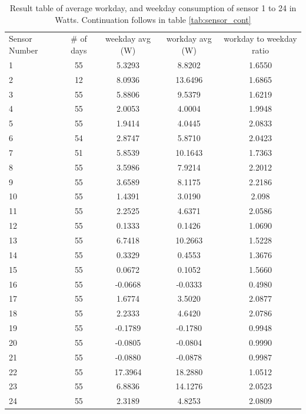 \begin{table}[h]
	\centering
	\begin{tabular}{l|c|c|c|c}
		Sensor Number & \# of days & weekday avg (W) & workday avg (W)& workday to weekday ratio \\
		1 & 55 & 5.3293 & 8.8202 & 1.6550 \\
		2 & 12 & 8.0936 & 13.6496 & 1.6865 \\ 
		3 & 55 & 5.8806 & 9.5379 & 1.6219  \\ 
		4 & 55 & 2.0053 & 4.0004 & 1.9948 \\
		5 & 55 & 1.9414 & 4.0445 & 2.0833 \\
		6 & 54 & 2.8747 & 5.8710 & 2.0423 \\ 
		7 & 51 & 5.8539 & 10.1643 & 1.7363  \\ 
		8 & 55 & 3.5986 & 7.9214 & 2.2012 \\
		9 & 55 & 3.6589 & 8.1175 & 2.2186 \\
		10 & 55 & 1.4391 & 3.0190 & 2.098 \\
		11 & 55 & 2.2525 & 4.6371 & 2.0586 \\ 
		12 & 55 & 0.1333 & 0.1426 & 1.0690 \\
		13 & 55 & 6.7418 & 10.2663 & 1.5228 \\
		14 & 55 & 0.3329 & 0.4553 & 1.3676 \\
		15 & 55 & 0.0672 & 0.1052 & 1.5660 \\
		16 & 55 & -0.0668 & -0.0333 & 0.4980 \\
		17 & 55 & 1.6774 & 3.5020 & 2.0877 \\
		18 & 55 & 2.2333 & 4.6420 & 2.0786 \\
		19 & 55 & -0.1789 & -0.1780 & 0.9948 \\
		20 & 55 & -0.0805 & -0.0804 & 0.9990 \\ 
		21 & 55 & -0.0880 & -0.0878 & 0.9987 \\
		22 & 55 & 17.3964 & 18.2880 & 1.0512 \\
		23 & 55 & 6.8836 & 14.1276 & 2.0523 \\
		24 & 55 & 2.3189 & 4.8253 & 2.0809 \\
	\end{tabular}
	\caption{Result table of average \gls{workday}, and weekday consumption of sensor 1 to 24 in Watts. Continuation follows in table \ref{tab:sensor_cont}}
	\label{tab:sensor}
\end{table}
